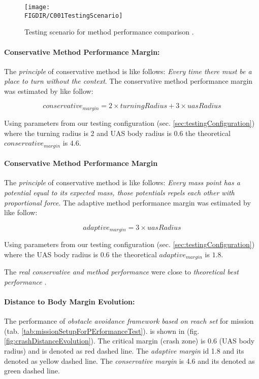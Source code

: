 \begin{figure}[H]
    \centering
    \texttt{[image: \\FIGDIR/C001TestingScenario]} 
    \caption{Testing scenario for method performance comparison \cite{hrdlik2018}.}
    \label{fig:avoidancePerformanceScenarioHrdlik}
\end{figure}

\paragraph{Conservative Method Performance Margin:} The \emph{principle} of conservative method is like follows: \emph{Every time there must be a place to turn without the context}. The conservative method performance margin was estimated by \cite{hrdlik2018} like follow:

\begin{equation*}
    conservative_{margin} = 2 \times turning Radius +3 \times uas Radius
\end{equation*}

\noindent Using parameters from our testing configuration (sec. \ref{sec:testingConfiguration}) where the turning radius is 2 and UAS body radius is 0.6 the theoretical $conservative_{margin}$ is $4.6$.

\paragraph{Conservative Method Performance Margin} The \emph{principle} of conservative method is like follows: \emph{Every mass point has a potential equal to its expected mass, those potentials repels each other with proportional force}. The adaptive method performance margin was estimated by \cite{hrdlik2018} like follow:

\begin{equation*}
    adaptive_{margin} = 3\times uas Radius
\end{equation*}

\noindent Using parameters from our testing configuration (sec. \ref{sec:testingConfiguration}) where the UAS body radius is 0.6 the theoretical $adaptive_{margin}$ is $1.8$.

\begin{note}
    The \emph{real conservative and method performance}  were close to \emph{theoretical best performance} \cite{hrdlik2018}.
\end{note}

\paragraph{Distance to Body Margin Evolution:} The performance of \emph{obstacle avoidance framework based on reach set} for mission (tab. \ref{tab:missionSetupForPErformanceTest}). is shown in (fig. \ref{fig:crashDistanceEvolution}). The critical margin (crash zone) is 0.6 (UAS body radius) and is denoted as red dashed line. The \emph{adaptive margin} id 1.8 and its denoted as yellow dashed line. The \emph{conservative margin} is 4.6 and its denoted as green dashed line. 

